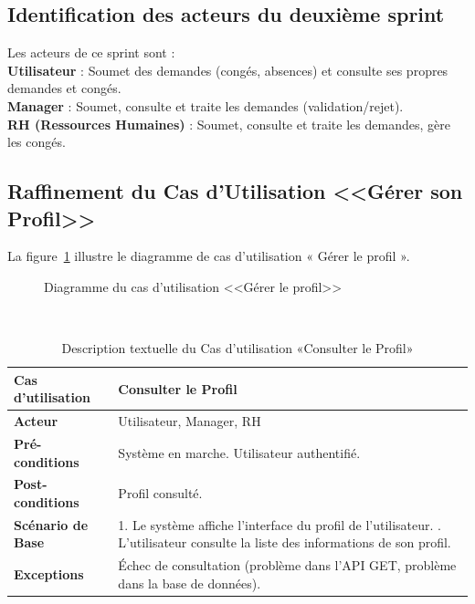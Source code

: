 \subsection{Identification des acteurs du deuxième sprint}
Les acteurs de ce sprint sont : \\
\textbf{Utilisateur} : Soumet des demandes (congés, absences) et consulte ses propres demandes et congés. \\
\textbf{Manager} : Soumet, consulte et traite les demandes (validation/rejet). \\
\textbf{RH (Ressources Humaines)} : Soumet, consulte et traite les demandes, gère les congés.
\subsection{Raffinement du Cas d'Utilisation <<Gérer son Profil>>}
La figure~\ref{fig:usecaseGP} illustre le diagramme de cas d'utilisation « Gérer le profil ».
\begin{figure}[h]
     \centering
     \caption{Diagramme du cas d'utilisation <<Gérer le profil>>}
     \label{fig:usecaseGP}
\end{figure}\\
\begin{table}[!ht]
\centering
\caption{Description textuelle du Cas d’utilisation «Consulter le Profil»}
\label{tab:view_profile}
\renewcommand{\arraystretch}{1.2}
\begin{tabular}{|p{4.2cm}|p{11cm}|}
\hline
\textbf{Cas d'utilisation} & Consulter le Profil \\
\hline
\textbf{Acteur} & Utilisateur, Manager, RH\\
\hline
\textbf{Pré-conditions} & Système en marche. \newline Utilisateur authentifié. \\
\hline
\textbf{Post-conditions} & Profil consulté. \\
\hline
\textbf{Scénario de Base} & 
1. Le système affiche l'interface du profil de l'utilisateur. \newline
2. L'utilisateur consulte la liste des informations de son profil. \\
\hline
\textbf{Exceptions} & 
Échec de consultation (problème dans l’API GET, problème dans la base de données). \\
\hline
\end{tabular}
\end{table}
